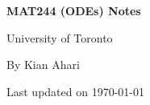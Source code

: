 \documentclass[12pt, letterpaper]{article}
\theoremstyle{definition}
\theoremstyle{remark}
\renewcommand{\bold}[1]{\textbf{#1}}
\begin{document}
\begin{titlepage}
	\begin{titlepage}
		\begin{flushright}
			\LARGE
			\bold{MAT244 (ODEs) Notes}
			
			\vspace{0.5cm}
			\large
			University of Toronto
			\vspace{0.5 cm}

			By Kian Ahari
			\vspace{0.5 cm}
			
			Last updated on \today
			\vfill
		\end{flushright}
	\end{titlepage}
\end{titlepage}
\newpage
\thispagestyle{empty}
\tableofcontents
\newpage

\newpage

\newpage

\newpage
 
\newpage

\newpage

\newpage

\newpage

\end{document}
